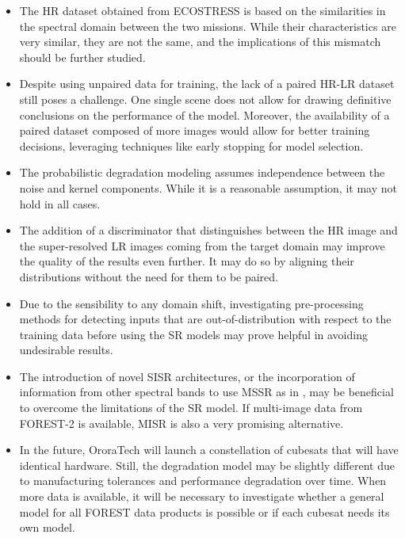 \begin{itemize}

    \item The HR dataset obtained from ECOSTRESS is based on the similarities in the spectral domain between the two missions. While their characteristics are very similar, they are not the same, and the implications of this mismatch should be further studied.
    
    \item Despite using unpaired data for training, the lack of a paired HR-LR dataset still poses a challenge. One single scene does not allow for drawing definitive conclusions on the performance of the model. Moreover, the availability of a paired dataset composed of more images would allow for better training decisions, leveraging techniques like early stopping for model selection. 
    
    \item The probabilistic degradation modeling assumes independence between the noise and kernel components. While it is a reasonable assumption, it may not hold in all cases.
    
    \item The addition of a discriminator that distinguishes between the HR image and the super-resolved  LR images coming from the target domain may improve the quality of the results even further. It may do so by aligning their distributions without the need for them to be paired.
    
    \item Due to the sensibility to any domain shift, investigating pre-processing methods for detecting inputs that are out-of-distribution with respect to the training data before using the SR models may prove helpful in avoiding undesirable results.
    
    \item The introduction of novel SISR architectures, or the incorporation of information from other spectral bands to use MSSR as in \cite{myself2023}, may be beneficial to overcome the limitations of the SR model. If multi-image data from FOREST-2 is available, MISR is also a very promising alternative.
    
    \item In the future, OroraTech will launch a constellation of cubesats that will have identical hardware. Still, the degradation model may be slightly different due to manufacturing tolerances and performance degradation over time. When more data is available, it will be necessary to investigate whether a general model for all FOREST data products is possible or if each cubesat needs its own model.
    

\end{itemize}
